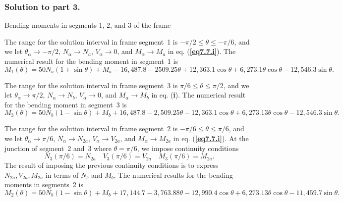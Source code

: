 \documentclass{AeroStructure-ERJohnson}
\begin{document}
\begin{example}
\subsubsection{Solution to part 3.} Bending moments in segments 1, 2, and 3 of the frame

The range for the solution interval in frame segment~1 is $-\pi / 2 \leq \theta \leq-\pi / 6$, and we let $\theta_{\alpha} \rightarrow-\pi / 2$, $N_{\alpha} \rightarrow N_{a}$, $V_{\alpha} \rightarrow 0$, and $M_{\alpha} \rightarrow M_{a}$ in eq. (\textbf{\ref{eq7.7.i}}). The numerical result for the bending moment in segment~1 is
\begin{equation}
M_{1}(\theta)=50 N_{a}(1+\sin \theta)+M_{a}-16{,}487.8-2509.25 \theta+12,363.1 \cos \theta+6{,}273.1 \theta \cos \theta-12{,}546.3 \sin \theta. \label{eq7.7.n}\tag{n}
\end{equation}

\removelastskip

The range for the solution interval in frame segment~3 is $\pi/6 \leq \theta \leq \pi/2$, and we let $\theta_{\alpha} \rightarrow \pi / 2$, $N_{\alpha} \rightarrow N_{b}$, $V_{\alpha} \rightarrow 0$, and $M_{\alpha} \rightarrow M_{b}$ in eq. (\textbf{i}). The numerical result for the bending moment in segment~3 is
\begin{equation}
M_{3}(\theta)=50 N_{b}(1-\sin \theta)+M_{b}+16{,}487.8-2{,}509.25 \theta-12{,}363.1 \cos \theta+6{,}273.13 \theta \cos \theta-12{,}546.3 \sin \theta. \label{eq7.7.o}\tag{o}
\end{equation}

\removelastskip

The range for the solution interval in frame segment~2 is $-\pi / 6 \leq \theta \leq \pi / 6$, and we let $\theta_{\alpha} \rightarrow \pi / 6$, $N_{\alpha} \rightarrow N_{2 a}$, $V_{\alpha} \rightarrow V_{2 a}$, and $M_{\alpha} \rightarrow M_{2 a}$ in eq. (\textbf{\ref{eq7.7.i}}). At the junction of segment~2 and~3 where $\theta=\pi / 6$, we impose continuity conditions
\begin{equation}
N_{3}(\pi / 6)=N_{2 a} \quad V_{3}(\pi / 6)=V_{2 a} \quad M_{3}(\pi / 6)=M_{2 a}. \label{eq7.7.p}\tag{p}
\end{equation}
The result of imposing the previous continuity conditions is to express $N_{2a}, V_{2a}, M_{2a}$ in terms of $N_{{b}}$ and $M_{{b}}$. The numerical results for the bending moments in segments~2 is
\begin{equation}
M_{2}(\theta)=50 N_{b}(1-\sin \theta)+M_{b}+17{,}144.7-3{,}763.88 \theta-12{,}990.4 \cos \theta+6{,}273.13 \theta \cos \theta-11{,}459.7 \sin \theta. \label{eq7.7.q}\tag{q}
\end{equation}


\end{example}
\end{document}
